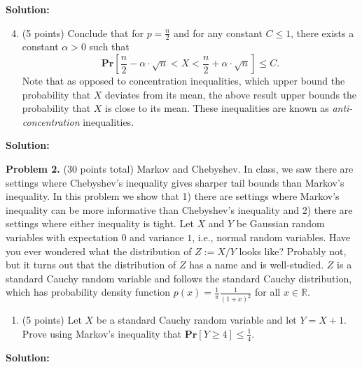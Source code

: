 \documentclass[11pt]{article}
\newcommand{\PPr}[1]{\ensuremath{\mathbf{Pr}\left[#1\right]}}
\begin{document}
\noindent\textbf{Solution:}








\begin{enumerate}
\setcounter{enumi}{3}
\item (5 points)
Conclude that for $p=\frac{n}{2}$ and for any constant $C\le 1$, there exists a constant $\alpha>0$ such that
\[\PPr{\frac{n}{2}-\alpha\cdot\sqrt{n}<X<\frac{n}{2}+\alpha\cdot\sqrt{n}}\le C.\]
Note that as opposed to concentration inequalities, which upper bound the probability that $X$ deviates from its mean, the above result upper bounds the probability that $X$ is close to its mean. These inequalities are known as \emph{anti-concentration} inequalities. 
\end{enumerate}

\noindent\textbf{Solution:}







\newpage\noindent
\textbf{Problem 2.} (30 points total)
Markov and Chebyshev.
\vskip 0.1in\noindent
In class, we saw there are settings where Chebyshev's inequality gives sharper tail bounds than Markov's inequality. In this problem we show that 1) there are settings where Markov's inequality can be more informative than Chebyshev's inequality and 2) there are settings where either inequality is tight. 
\vskip 0.1in\noindent
Let $X$ and $Y$ be Gaussian random variables with expectation $0$ and variance $1$, i.e., normal random variables. Have you ever wondered what the distribution of $Z:=X/Y$ looks like? Probably not, but it turns out that the distribution of $Z$ has a name and is well-studied. $Z$ is a standard Cauchy random variable and follows the standard Cauchy distribution, which has probability density function $p(x)=\frac{1}{\pi}\frac{1}{(1+x)^2}$ for all $x\in\mathbb{R}$. 
\begin{enumerate}
\item (5 points)
Let $X$ be a standard Cauchy random variable and let $Y=X+1$. 
Prove using Markov's inequality that $\PPr{Y\ge 4}\le\frac{1}{4}$. 
\end{enumerate}

\noindent\textbf{Solution:}
\end{document}
